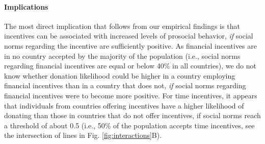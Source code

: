 \documentclass[AER]{AEA}
\begin{document}

\paragraph{Implications}

The most direct implication that follows from our empirical findings is that incentives can be associated with increased levels of prosocial behavior, \textit{if} social norms regarding the incentive are sufficiently positive. As financial incentives are in no country accepted by the majority of the population (i.e., social norms regarding financial incentives are equal or below 40\% in all countries), we do not know whether donation likelihood could be higher in a country employing financial incentives than in a country that does not, \textit{if} social norms regarding financial incentives were to become more positive. For time incentives, it appears that individuals from countries offering incentives have a higher likelihood of donating than those in countries that do not offer incentives, if social norms reach a threshold of about 0.5 (i.e., 50\% of the population accepts time incentives, see the intersection of lines in Fig. \ref{fig:interactions}B). 
\end{document}
